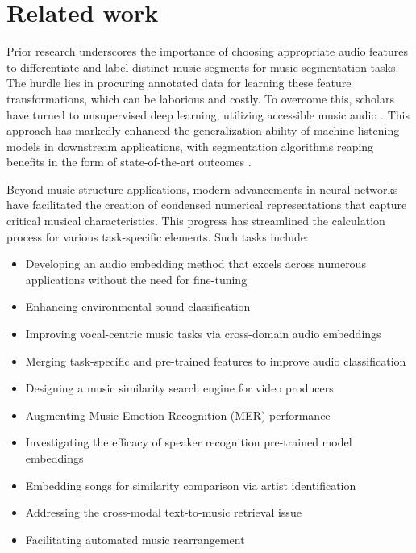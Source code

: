 \section{Related work}

Prior research underscores the importance of choosing appropriate audio features to differentiate and label distinct music segments for music segmentation tasks. The hurdle lies in procuring annotated data for learning these feature transformations, which can be laborious and costly. To overcome this, scholars have turned to unsupervised deep learning, utilizing accessible music audio \cite{unsupervisedlearndeepfeat, GrillMUSICANNOTATIONS}. This approach has markedly enhanced the generalization ability of machine-listening models in downstream applications, with segmentation algorithms reaping benefits in the form of state-of-the-art outcomes \cite{Hernandez-Olivan2021MusicFeatures, SalamonDeepSegmentation, teacher, Li2023MERT:Training}.

Beyond music structure applications, modern advancements in neural networks have facilitated the creation of condensed numerical representations that capture critical musical characteristics. This progress has streamlined the calculation process for various task-specific elements. Such tasks include:

\begin{itemize}
\item Developing an audio embedding method that excels across numerous applications without the need for fine-tuning \cite{Turian2022HEAR:Representations}
\item Enhancing environmental sound classification \cite{Kim2020OneStrategies, CramerLOOKEMBEDDINGS}
\item Improving vocal-centric music tasks via cross-domain audio embeddings \cite{Kim2021LearningLoss}
\item Merging task-specific and pre-trained features to improve audio classification \cite{Hung2022Feature-informedClassification}
\item Designing a music similarity search engine for video producers \cite{epidemic}
\item Augmenting Music Emotion Recognition (MER) performance \cite{KohComparisonRecognition}
\item Investigating the efficacy of speaker recognition pre-trained model embeddings \cite{lightweight}
\item Embedding songs for similarity comparison via artist identification \cite{contentmusicsimtriplet2020}
\item Addressing the cross-modal text-to-music retrieval issue \cite{WonEmotionStories}
\item Facilitating automated music rearrangement \cite{Stoller2018IntuitiveTransitions, Plachouras2023MusicSegmentation}
\end{itemize}

